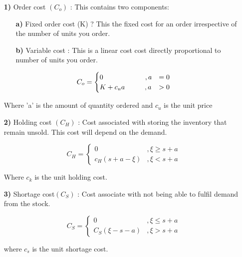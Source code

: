 \documentclass[10pt,a4paper,oneside]{report}
\begin{document}
\begin{enumerate}
\item[\textbf{1)}] Order cost $(C_o)$ : This contains two components:
\begin{enumerate}
\item[\textbf{a)}] Fixed order cost (K) ? This the fixed cost for an order irrespective of the number of units you order.
\item[\textbf{b)}] Variable cost : This is a linear cost cost directly proportional to number of units you order.\\
\end{enumerate}
\begin{equation*}
C_o = 
\begin{cases}
0   \hspace{2.12cm}          ,a&=0\\
K+ c_u {a}     \hspace{1cm}           ,a&>0
\end{cases}
\end{equation*}

\hspace{6mm} Where 'a' is the amount of quantity ordered and $c_u$  is the unit price

\item[\textbf{2)}]Holding cost $(C_H)$ : Cost associated with storing the inventory that remain unsold. This cost will depend on the demand.

\begin{equation*}
C_H = 
\begin{cases}
0   &,\xi \geq s+a\\
c_H(s+a-\xi)     & ,\xi <s+a
\end{cases}
\end{equation*}
\begin{flushleft}Where $c_k$ is the unit holding cost.
\end{flushleft}

\item[\textbf{3)}]	Shortage cost$(C_S)$ : Cost associate with not being able to fulfil demand from the stock. 

\begin{equation*}
C_S = 
\begin{cases}
0          &,\xi \leq s+a\\
C_S(\xi-s-a)     &  ,\xi >s+a
\end{cases}
\end{equation*}
\begin{flushleft}where $c_s$ is the unit shortage cost.
\end{flushleft}
\end{enumerate}
\end{document}
